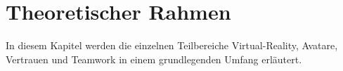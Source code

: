 \documentclass[a4paper,11pt]{article}%
\renewcommand{\\}{\vspace*{0.5\baselineskip} \newline}
\begin{document}
	
	


%
%
%
%

	\newpage
\section{Theoretischer Rahmen}

In diesem Kapitel werden die einzelnen Teilbereiche \dq{}Virtual-Reality\dq{}, \dq{}Avatare\dq{}, \dq{}Vertrauen\dq{} und \dq{}Teamwork\dq{} in einem grundlegenden Umfang  erläutert.
\end{document}
